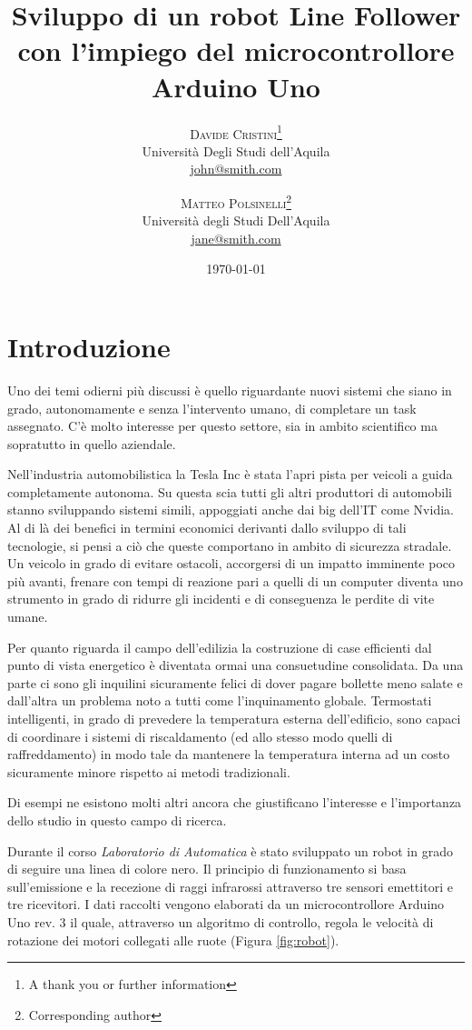 \documentclass[twoside,twocolumn]{article}
\title{Sviluppo di un robot Line Follower con l'impiego del microcontrollore Arduino Uno} %
\author{%
\textsc{Davide Cristini}\thanks{A thank you or further information} \\[1ex] %
\normalsize Università Degli Studi dell'Aquila \\ %
\normalsize \href{mailto:john@smith.com}{john@smith.com} 
\and 
\textsc{Matteo Polsinelli}\thanks{Corresponding author} \\[1ex]
\normalsize Università degli Studi Dell'Aquila \\ 
\normalsize \href{mailto:polsinellimatteo91@gmail.com}{jane@smith.com}
}
\date{\today} %
\begin{document}
\maketitle


\section{Introduzione}
Uno dei temi odierni più discussi è quello riguardante nuovi sistemi che siano in grado, autonomamente e senza l'intervento umano, di completare un task assegnato.
C'è molto interesse per questo settore, sia in ambito scientifico ma sopratutto in quello aziendale. 

Nell'industria automobilistica la Tesla Inc è stata l'apri pista per veicoli a guida completamente autonoma. Su questa scia tutti gli altri produttori di automobili stanno sviluppando sistemi simili, appoggiati anche dai big dell'IT come Nvidia. Al di là dei benefici in termini economici derivanti dallo sviluppo di tali tecnologie, si pensi a ciò che queste comportano in ambito di sicurezza stradale. Un veicolo in grado di evitare ostacoli, accorgersi di un impatto imminente poco più avanti, frenare con tempi di reazione pari a quelli di un  computer diventa uno strumento in grado di ridurre gli incidenti e di conseguenza le perdite di vite umane. 

Per quanto riguarda il campo dell'edilizia la costruzione di case efficienti dal punto di vista energetico è diventata ormai una consuetudine consolidata. Da una parte ci sono gli inquilini sicuramente felici di dover pagare bollette meno salate e dall'altra un problema noto a tutti come l'inquinamento globale. Termostati intelligenti, in grado di prevedere la temperatura esterna dell'edificio, sono capaci di coordinare i sistemi di riscaldamento (ed allo stesso modo quelli di raffreddamento) in modo tale da mantenere la temperatura interna ad un costo sicuramente minore rispetto ai metodi tradizionali.

Di esempi ne esistono molti altri ancora che giustificano l'interesse e l'importanza dello studio in questo campo di ricerca.

Durante il corso \textit{Laboratorio di Automatica} è stato sviluppato un robot in grado di seguire una linea di colore nero. Il principio di funzionamento si basa sull'emissione e la recezione di raggi infrarossi attraverso tre sensori emettitori e tre ricevitori. I dati raccolti vengono elaborati da un microcontrollore Arduino Uno rev. 3 il quale, attraverso un algoritmo di controllo, regola le velocità di rotazione dei motori collegati alle ruote (Figura \ref{fig:robot}).
\end{document}
